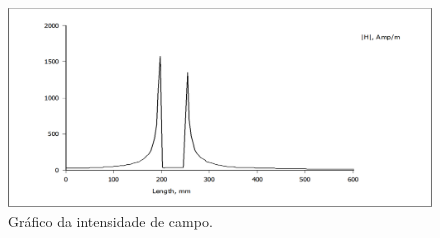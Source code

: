 \begin{figure}[H]
\centering
\includegraphics[scale=0.3]{img/linha_H.png}
\caption[Gráfico da intensidade de campo]{Gráfico da intensidade de campo.}
\label{graf2_ic}
\end{figure}
